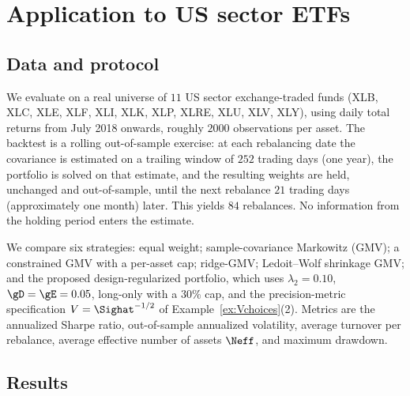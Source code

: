 \section{Application to US sector ETFs}
\label{sec:applications}

\subsection{Data and protocol}
We evaluate on a real universe of $11$ US sector exchange-traded funds (XLB,
XLC, XLE, XLF, XLI, XLK, XLP, XLRE, XLU, XLV, XLY), using daily total returns
from July 2018 onwards, roughly $2000$ observations per asset. The backtest is a
rolling out-of-sample exercise: at each rebalancing date the covariance is
estimated on a trailing window of $252$ trading days (one year), the portfolio is
solved on that estimate, and the resulting weights are held, unchanged and
out-of-sample, until the next rebalance $21$ trading days (approximately one
month) later. This yields $84$ rebalances. No information from the holding period
enters the estimate.

We compare six strategies: equal weight; sample-covariance Markowitz (GMV);
a constrained GMV with a per-asset cap; ridge-GMV; Ledoit--Wolf shrinkage GMV;
and the proposed design-regularized portfolio, which uses
$\lambda_2=0.10$, $\gD=\gE=0.05$, long-only with a $30\%$ cap, and the
precision-metric specification $V=\Sighat^{-1/2}$ of
Example~\ref{ex:Vchoices}(2). Metrics are the annualized Sharpe ratio,
out-of-sample annualized volatility, average turnover per rebalance, average
effective number of assets $\Neff$, and maximum drawdown.

\subsection{Results}

